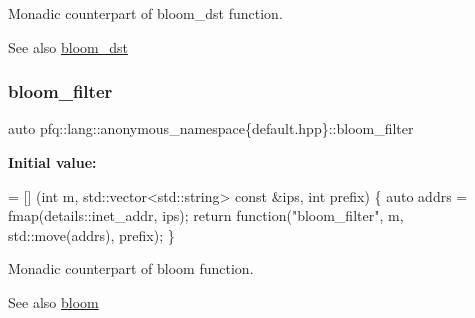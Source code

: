 Monadic counterpart of {\ttfamily bloom\+\_\+dst} function. 

\begin{DoxySeeAlso}{See also}
\hyperlink{namespacepfq_1_1lang_1_1anonymous__namespace_02default_8hpp_03_ac1c667000a13acfbda8490d5748b91c4}{bloom\+\_\+dst} 
\end{DoxySeeAlso}
\mbox{\label{namespacepfq_1_1lang_1_1anonymous__namespace_02default_8hpp_03_a3a5eda5d7a49e279941725df8388378d}} 
\subsubsection{\texorpdfstring{bloom\+\_\+filter}{bloom\_filter}}
{\footnotesize\ttfamily auto pfq\+::lang\+::anonymous\+\_\+namespace\{default.\+hpp\}\+::bloom\+\_\+filter}

{\bfseries Initial value\+:}
\begin{DoxyCode}
= [] (\textcolor{keywordtype}{int} m, std::vector<std::string> \textcolor{keyword}{const} &ips, \textcolor{keywordtype}{int} prefix) \{
                                    \textcolor{keyword}{auto} addrs = fmap(details::inet\_addr, ips);
                                    \textcolor{keywordflow}{return} \textcolor{keyword}{function}(\textcolor{stringliteral}{"bloom\_filter"}, m, std::move(addrs), prefix);
                                \}
\end{DoxyCode}


Monadic counterpart of {\ttfamily bloom} function. 

\begin{DoxySeeAlso}{See also}
\hyperlink{namespacepfq_1_1lang_1_1anonymous__namespace_02default_8hpp_03_abfcd230137acb93cfd99f7a0a7c1f17f}{bloom} 
\end{DoxySeeAlso}
\mbox{\label{namespacepfq_1_1lang_1_1anonymous__namespace_02default_8hpp_03_aa2a8ff506d61e93d8eca4419513970f4}} 
